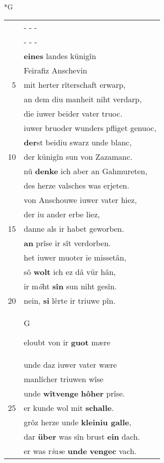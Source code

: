 \documentclass[8pt,a4paper,notitlepage]{article}
\begin{document}
\begin{table}[ht]
\begin{minipage}[t]{0.5\linewidth}
\small
\begin{center}*G
\end{center}
\begin{tabular}{rl}
 & \multicolumn{1}{l}{ - - - }\\ 
 & \multicolumn{1}{l}{ - - - }\\ 
 & \textbf{eines} landes künigîn\\ 
 & Feirafiz Anschevin\\ 
5 & mit herter rîterschaft erwarp,\\ 
 & an dem diu manheit niht verdarp,\\ 
 & die iuwer beider vater truoc.\\ 
 & iuwer bruoder wunders pfliget genuoc,\\ 
 & \textbf{der}st beidiu swarz unde blanc,\\ 
10 & der künigîn sun von Zazamanc.\\ 
 & nû \textbf{denke} ich aber an Gahmureten,\\ 
 & des herze valsches was erjeten.\\ 
 & von Anschouwe iuwer vater hiez,\\ 
 & der iu ander erbe liez,\\ 
15 & danne als ir habet geworben.\\ 
 & \textbf{an} prîse ir sît verdorben.\\ 
 & het iuwer muoter ie missetân,\\ 
 & sô \textbf{wolt} ich ez dâ vür hân,\\ 
 & ir m\textit{ö}ht \textbf{sîn} sun niht gesîn.\\ 
20 & nein, \textbf{si} lêrte ir triuwe pîn.\\ 
 & \begin{large}G\end{large}eloubt von ir \textbf{guot} mære\\ 
 & unde daz iuwer vater wære\\ 
 & manlîcher triuwen wîse\\ 
 & unde \textbf{wîtvenge} \textbf{hôher} prîse.\\ 
25 & er kunde wol mit \textbf{schalle}.\\ 
 & grôz herze unde \textbf{kleiniu galle},\\ 
 & dar \textbf{über} was sîn brust \textbf{ein} dach.\\ 
 & er was r\textit{i}u\textit{s}e \textbf{unde} \textbf{vengec} vach.\\ 

\end{tabular}
\end{minipage}
\end{table}
\end{document}
